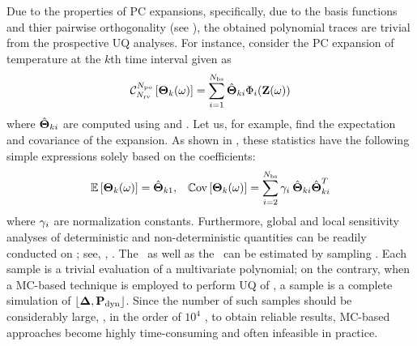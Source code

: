 Due to the properties of PC expansions, specifically, due to the basis functions and thier pairwise orthogonality (see ), the obtained polynomial traces are trivial from the prospective UQ analyses. For instance, consider the PC expansion of temperature at the $k$th time interval given as
\begin{equation} \elabel{pc-k}
  \oPC{\vars}{\pcorder}{\vTO_k(\o)} = \sum_{i = 1}^{\pcterms} \pcc{\vTO}_{ki} \pcb_i(\vZ(\o))
\end{equation}
where $\hat{{\boldsymbol\Theta}}_{ki}$ are computed using  and . Let us, for example, find the expectation and covariance of the expansion. As shown in , these statistics have the following simple expressions solely based on the coefficients:
\begin{align} \elabel{pc-moments}
  & \oExp{\vTO_k(\o)} = \pcc{\vTO}_{k1}, & \oCov{\vTO_k(\o)} = \sum_{i = 2}^{\pcterms} \pcn_i \: \pcc{\vTO}_{ki} \pcc{\vTO}_{ki}^T
\end{align}
where $\gamma_i$ are normalization constants. Furthermore, global and local sensitivity analyses of deterministic and non-deterministic quantities can be readily conducted on ; see, \eg, \cite{eldred2009, maitre2010}. The \cdf\ as well as the \pdf\ can be estimated by sampling . Each sample is a trivial evaluation of a multivariate polynomial; on the contrary, when a MC-based technique is employed to perform UQ of , a sample is a complete simulation of $\profPdyn$. Since the number of such samples should be considerably large, \eg, in the order of $10^4$ \cite{xiu2010, diaz-emparanza2002}, to obtain reliable results, MC-based approaches become highly time-consuming and often infeasible in practice.
